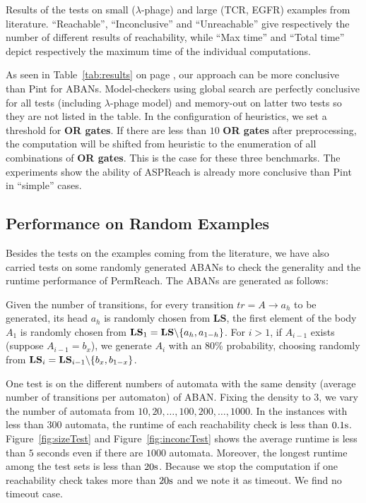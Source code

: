 \begin{table}[ht]
\caption[Comparison of different analyzers]{
Results of the tests on small ($\lambda$-phage) and large (TCR, EGFR) examples from literature. 
``Reachable'', ``Inconclusive'' and ``Unreachable'' give respectively the number of different results of reachability, while ``Max time'' and ``Total time'' depict respectively the maximum time of the individual computations.}\label{tab:results}
\end{table}

As seen in Table~\ref{tab:results} on page \pageref{tab:results}, our approach can be more conclusive than Pint for ABANs.
Model-checkers using global search are perfectly conclusive for all tests (including $\lambda$-phage model) and memory-out on latter two tests so they are not listed in the table.
In the configuration of heuristics, we set a threshold for \textbf{OR gates}.
If there are less than $10$ \textbf{OR gates} after preprocessing, the computation will be shifted from heuristic to the enumeration of all combinations of \textbf{OR gates}.
This is the case for these three benchmarks. The experiments show the ability of ASPReach is already more conclusive than Pint in ``simple'' cases.
\subsection{Performance on Random Examples}

Besides the tests on the examples coming from the literature, we have also carried tests on some randomly generated ABANs to check the generality and the runtime performance of PermReach. 
The ABANs are generated as follows:

Given the number of transitions, for every transition $tr=A\to a_h$ to be generated, its head $a_h$ is randomly chosen from $\mathbf{LS}$, the first element of the body $A_1$ is randomly chosen from $\mathbf{LS}_1=\mathbf{LS}\miset{a_h,a_{1-h}}$.
For $i>1$, if $A_{i-1}$ exists (suppose $A_{i-1}=b_x$), we generate $A_i$ with an 80\% probability, choosing randomly from $\mathbf{LS}_i=\mathbf{LS}_{i-1}\miset{b_x,b_{1-x}}$. 
 
One test is on the different numbers of automata with the same density (average number of transitions per automaton) of ABAN. Fixing the density to 3, we vary the number of automata from $10,20,\ldots,100,200,\ldots,1000$.
In the instances with less than 300 automata, the runtime of each reachability check is less than $0.1{\rm s}$.
Figure~\ref{fig:sizeTest} and Figure~\ref{fig:inconcTest} shows the average runtime is less than $5$ seconds even if there are $1000$ automata. 
Moreover, the longest runtime among the test sets is less than $20{\rm s}$. 
Because we stop the computation if one reachability check takes more than $20{\rm s}$ and we note it as timeout.
We find no timeout case.


